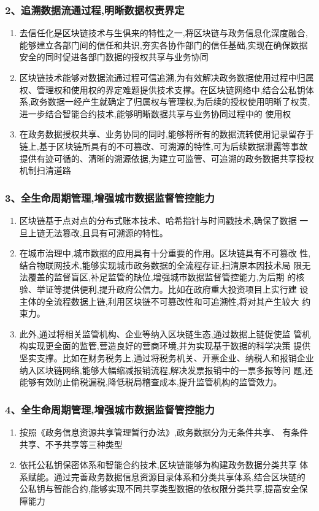\documentclass[11pt]{beamer}
\begin{document}
\begin{frame}
	\frametitle{2、追溯数据流通过程,明晰数据权责界定}
	\begin{enumerate}
		\item 去信任化是区块链技术与生俱来的特性之一,将区块链与政务信息化深度融合,能够建立各部门间的信任和共识,夯实各协作部门的信任基础,实现在确保数据安全的同时促进各部门数据的授权共享与业务协同
		\item 区块链技术能够对数据流通过程可信追溯,为有效解决政务数据使用过程中归属权、管理权和使用权的界定难题提供技术支撑。在区块链网络中,结合公私钥体系,政务数据一经产生就确定了归属权与管理权,为后续的授权使用明晰了权责,进一步结合智能合约技术,能够明晰数据共享与业务协同过程中的
		      使用权
		\item 在政务数据授权共享、业务协同的同时,能够将所有的数据流转使用记录留存于链上,基于区块链所具有的不可篡改、可溯源的特性,可为后续数据泄露等事故提供有迹可循的、清晰的溯源依据,为建立可监管、可追溯的政务数据共享授权机制扫清道路
	\end{enumerate}
\end{frame}

\begin{frame}
	\frametitle{3、全生命周期管理,增强城市数据监督管控能力}
	\begin{enumerate}
		\item 区块链基于点对点的分布式账本技术、哈希指针与时间戳技术,确保了数据
		      一旦上链无法篡改,且具有可溯源的特性。
		\item 在城市治理中,城市数据的应用具有十分重要的作用。区块链具有不可篡改
		      性,结合物联网技术,能够实现城市政务数据的全流程存证,扫清原本因技术局
		      限无法覆盖的监督盲区,补足监管的缺位,增强城市数据监督管控能力,为后期
		      的核验、举证等提供便利,提升政府公信力。比如在政府重大投资项目上实行建
		      设主体的全流程数据上链,利用区块链不可篡改性和可追溯性,将对其产生较大
		      约束力。
		\item 此外,通过将相关监管机构、企业等纳入区块链生态,通过数据上链促使监
		      管机构实现更全面的监管,营造良好的营商环境,并为实现基于数据的科学决策
		      提供坚实支撑。比如在财务税务上,通过将税务机关、开票企业、纳税人和报销企业纳入区块链网络,能够大幅缩减报销流程,解决发票报销中的一票多报等问
		      题,还能够有效防止偷税漏税,降低税局稽查成本,提升监管机构的监管效力。
	\end{enumerate}
\end{frame}

\begin{frame}
	\frametitle{4、全生命周期管理,增强城市数据监督管控能力}
	\begin{enumerate}
		\item 按照《政务信息资源共享管理暂行办法》,政务数据分为无条件共享、
		      有条件共享、不予共享等三种类型
		\item 依托公私钥保密体系和智能合约技术,区块链能够为构建政务数据分类共享
		      体系赋能。通过完善政务数据信息资源目录体系和分类共享体系,结合区块链的
		      公私钥与智能合约,能够实现不同共享类型数据的依权限分类共享,提高安全保
		      障能力
	\end{enumerate}
\end{frame}
\end{document}
